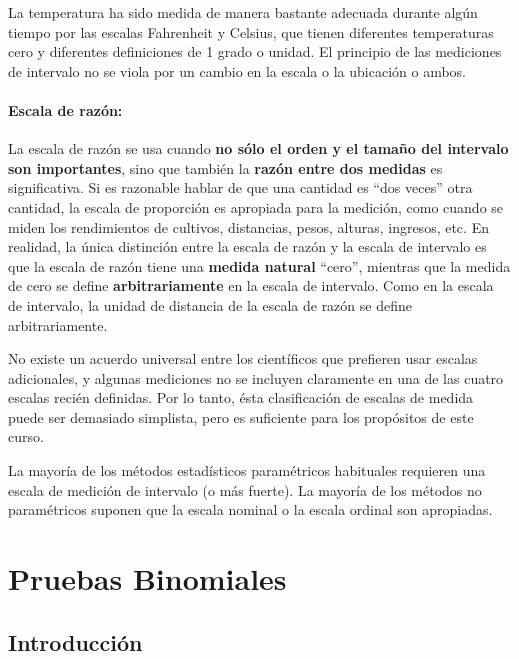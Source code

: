 \documentclass[
  a4paper,
  oneside,
  openany]{book}
\begin{document}
La temperatura ha sido medida de manera bastante adecuada durante algún tiempo por las escalas Fahrenheit y Celsius, que tienen diferentes temperaturas cero y diferentes definiciones de 1 grado o unidad. El principio de las mediciones de intervalo no se viola por un cambio en la escala o la ubicación o ambos.

\hypertarget{escala-de-razuxf3n}{%
\subsection{Escala de razón:}\label{escala-de-razuxf3n}}

La escala de razón se usa cuando \textbf{no sólo el orden y el tamaño del intervalo son importantes}, sino que también la \textbf{razón entre dos medidas} es significativa. Si es razonable hablar de que una cantidad es ``dos veces'' otra cantidad, la escala de proporción es apropiada para la medición, como cuando se miden los rendimientos de cultivos, distancias, pesos, alturas, ingresos, etc. En realidad, la única distinción entre la escala de razón y la escala de intervalo es que la escala de razón tiene una \textbf{medida natural} ``cero'', mientras que la medida de cero se define \textbf{arbitrariamente} en la escala de intervalo. Como en la escala de intervalo, la unidad de distancia de la escala de razón se define arbitrariamente.

No existe un acuerdo universal entre los científicos que prefieren usar escalas adicionales, y algunas mediciones no se incluyen claramente en una de las cuatro escalas recién definidas.
Por lo tanto, ésta clasificación de escalas de medida puede ser demasiado simplista, pero es suficiente para los propósitos de este curso.

La mayoría de los métodos estadísticos paramétricos habituales requieren una escala de medición de intervalo (o más fuerte). La mayoría de los métodos no paramétricos suponen que la escala nominal o la escala ordinal son apropiadas.

\hypertarget{part-pruebas-binomiales}{%
\part{Pruebas Binomiales}\label{part-pruebas-binomiales}}

\hypertarget{introducciuxf3n-1}{%
\chapter*{Introducción}\label{introducciuxf3n-1}}
\end{document}
